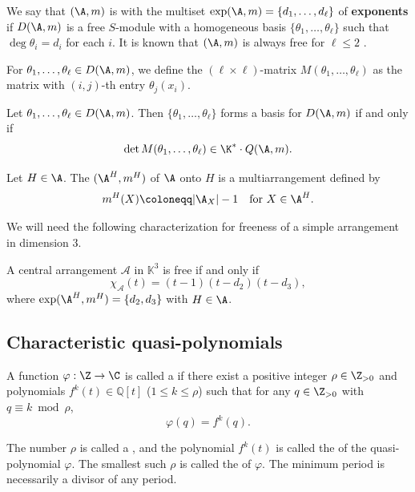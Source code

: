 We say that $(\A, m)$  is   with the multiset $ \exp(\A, m) = \{d_{1}, \dots, d_{\ell}\} $ of \textbf{exponents}  if $D(\A,m)$ is a free $S$-module with a homogeneous basis $ \{\theta_{1}, \dots, \theta_{\ell}\}$  such that $ \deg \theta_{i} = d_{i} $ for each $ i $. 
It is known that  $(\A, m)$ is always free for $\ell\le 2$ \cite[Corollary 7]{Z89}.

For $\theta_1, \ldots , \theta_\ell \in D(\A,m)$, we define the $(\ell \times\ell)$-matrix $M(\theta_1, \ldots , \theta_\ell)$ as the matrix with $(i,j)$-th entry $\theta_j(x_i)$. 
\begin{theorem}
\label{thm:criterion}
Let $\theta_1, \ldots , \theta_\ell \in D(\A,m)$. Then $\{\theta_1, \ldots , \theta_\ell\}$ forms a basis for $D(\A,m)$ if and only if
$$\det M(\theta_1, \ldots , \theta_\ell) \in \K^* \cdot Q(\A,m).$$
\end{theorem}
 

Let $H \in \A$. The  $(\A^H,m^H)$ of $\A$ onto $H$ is a multiarrangement defined by 
$$m^H(X) \coloneqq |\A_X|-1 \quad \mbox{for } X \in \A^H.$$ 

We will need the following characterization for freeness of a simple arrangement in dimension $3$. 
\begin{theorem}[{\cite[Corollary 3.3]{Yo05}}]
 \label{thm:Yo-3arr}
A central arrangement $ \mathcal{A}$ in $\mathbb{K}^3$ is free if and only if 
$$ \chi_{\mathcal{A}}(t) = (t-1)(t-d_2)(t-d_3),$$
where $\exp (\A^H, m^H)=\{d_2, d_3\}$ with $H \in \A$.
\end{theorem}


\subsection{Characteristic quasi-polynomials}
\label{subsec:characteristic-quasi}
A function $\varphi: \Z \to \C$ is called a  if there exist a positive integer $\rho\in\Z_{>0}$ and polynomials $f^k(t)\in\mathbb{Q}[t]$ ($1 \le k \le \rho$) such that for any $q\in\Z_{>0}$ with  $q\equiv k\bmod \rho$, 
\begin{equation*}
\varphi(q) =f^k(q).
\end{equation*}

The number $\rho$ is called a , and the polynomial $f^k(t)$ is called the  of the quasi-polynomial $\varphi$. 
The smallest such $\rho$ is called the  of  $\varphi$. 
The minimum period is necessarily a divisor of any period. 


